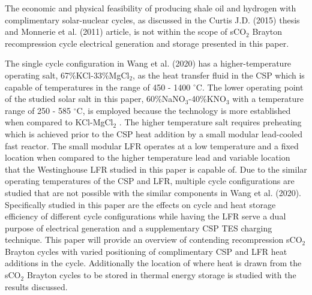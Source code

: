 The economic and physical feasibility of producing shale oil and hydrogen with complimentary solar-nuclear cycles, as discussed in the Curtis J.D. (2015) thesis and Monnerie et al. (2011) article, is not within the scope of sCO$_2$ Brayton recompression cycle electrical generation and storage presented in this paper.

The single cycle configuration in Wang et al. (2020) has a higher-temperature operating salt, 67\%KCl-33\%MgCl$_2$, as the heat transfer fluid in the CSP which is capable of temperatures in the range of 450 - 1400 $^{\circ}$C. The lower operating point of the studied solar salt in this paper, 60\%NaNO$_3$-40\%KNO$_3$ with a temperature range of 250 - 585 $^{\circ}$C, is employed because the technology is more established when compared to KCl-MgCl$_2$ \cite{turchi_2018}. The higher temperature salt requires preheating which is achieved prior to the CSP heat addition by a small modular lead-cooled fast reactor. The small modular LFR operates at a low temperature and a fixed location when compared to the higher temperature lead and variable location that the Westinghouse LFR studied in this paper is capable of. Due to the similar operating temperatures of the CSP and LFR, multiple cycle configurations are studied that are not possible with the similar components in Wang et al. (2020). Specifically studied in this paper are the effects on cycle and heat storage efficiency of different cycle configurations while having the LFR serve a dual purpose of electrical generation and a supplementary CSP TES charging technique. This paper will provide an overview of contending recompression sCO$_2$ Brayton cycles with varied positioning of complimentary CSP and LFR heat additions in the cycle. Additionally the location of where heat is drawn from the sCO$_2$ Brayton cycles to be stored in thermal energy storage is studied with the results discussed.



